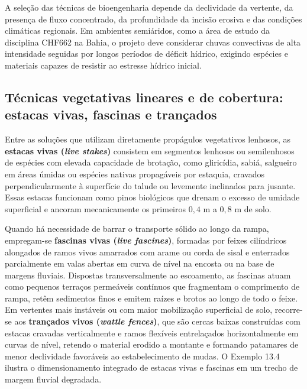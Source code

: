 A seleção das técnicas de bioengenharia depende da declividade da vertente, da presença de fluxo concentrado, da profundidade da incisão erosiva e das condições climáticas regionais. Em ambientes semiáridos, como a área de estudo da disciplina CHF662 na Bahia, o projeto deve considerar chuvas convectivas de alta intensidade seguidas por longos períodos de déficit hídrico, exigindo espécies e materiais capazes de resistir ao estresse hídrico inicial.

\subsection{Técnicas vegetativas lineares e de cobertura: estacas vivas, fascinas e trançados}

Entre as soluções que utilizam diretamente propágulos vegetativos lenhosos, as \textbf{estacas vivas (\textit{live stakes})} consistem em segmentos lenhosos ou semilenhosos de espécies com elevada capacidade de brotação, como gliricídia, sabiá, salgueiro em áreas úmidas ou espécies nativas propagáveis por estaquia, cravados perpendicularmente à superfície do talude ou levemente inclinados para jusante. Essas estacas funcionam como pinos biológicos que drenam o excesso de umidade superficial e ancoram mecanicamente os primeiros $0{,}4\text{ m}$ a $0{,}8\text{ m}$ de solo.

Quando há necessidade de barrar o transporte sólido ao longo da rampa, empregam-se \textbf{fascinas vivas (\textit{live fascines})}, formadas por feixes cilíndricos alongados de ramos vivos amarrados com arame ou corda de sisal e enterrados parcialmente em valas abertas em curva de nível na encosta ou na base de margens fluviais. Dispostas transversalmente ao escoamento, as fascinas atuam como pequenos terraços permeáveis contínuos que fragmentam o comprimento de rampa, retêm sedimentos finos e emitem raízes e brotos ao longo de todo o feixe. Em vertentes mais instáveis ou com maior mobilização superficial de solo, recorre-se aos \textbf{trançados vivos (\textit{wattle fences})}, que são cercas baixas construídas com estacas cravadas verticalmente e ramos flexíveis entrelaçados horizontalmente em curvas de nível, retendo o material erodido a montante e formando patamares de menor declividade favoráveis ao estabelecimento de mudas. O Exemplo 13.4 ilustra o dimensionamento integrado de estacas vivas e fascinas em um trecho de margem fluvial degradada.

